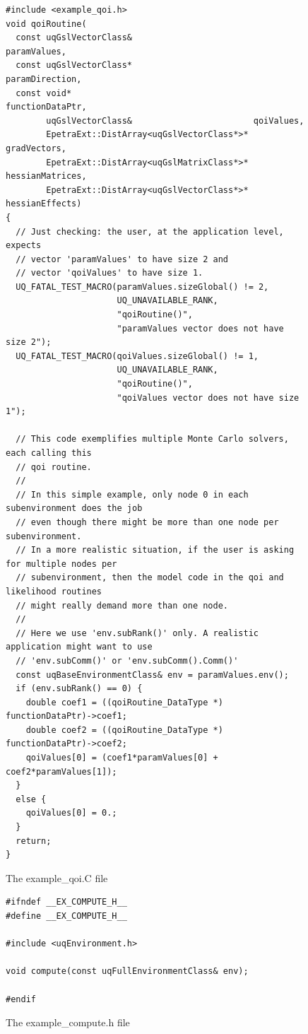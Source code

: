 \begin{figure}[h!]
\begin{center}
\begin{verbatim}
#include <example_qoi.h>
void qoiRoutine(
  const uqGslVectorClass&                        paramValues,
  const uqGslVectorClass*                        paramDirection,
  const void*                                    functionDataPtr,
        uqGslVectorClass&                        qoiValues,
        EpetraExt::DistArray<uqGslVectorClass*>* gradVectors,
        EpetraExt::DistArray<uqGslMatrixClass*>* hessianMatrices,
        EpetraExt::DistArray<uqGslVectorClass*>* hessianEffects)
{
  // Just checking: the user, at the application level, expects
  // vector 'paramValues' to have size 2 and
  // vector 'qoiValues' to have size 1.
  UQ_FATAL_TEST_MACRO(paramValues.sizeGlobal() != 2,
                      UQ_UNAVAILABLE_RANK,
                      "qoiRoutine()",
                      "paramValues vector does not have size 2");
  UQ_FATAL_TEST_MACRO(qoiValues.sizeGlobal() != 1,
                      UQ_UNAVAILABLE_RANK,
                      "qoiRoutine()",
                      "qoiValues vector does not have size 1");

  // This code exemplifies multiple Monte Carlo solvers, each calling this
  // qoi routine.
  //
  // In this simple example, only node 0 in each subenvironment does the job
  // even though there might be more than one node per subenvironment.
  // In a more realistic situation, if the user is asking for multiple nodes per
  // subenvironment, then the model code in the qoi and likelihood routines
  // might really demand more than one node.
  //
  // Here we use 'env.subRank()' only. A realistic application might want to use
  // 'env.subComm()' or 'env.subComm().Comm()'
  const uqBaseEnvironmentClass& env = paramValues.env();
  if (env.subRank() == 0) {
    double coef1 = ((qoiRoutine_DataType *) functionDataPtr)->coef1;
    double coef2 = ((qoiRoutine_DataType *) functionDataPtr)->coef2;
    qoiValues[0] = (coef1*paramValues[0] + coef2*paramValues[1]);
  }
  else {
    qoiValues[0] = 0.;
  }
  return;
}
\end{verbatim}
\end{center}
\caption{
The example\_qoi.C file
}
\label{fig-qoi-c}
\end{figure}

\begin{figure}[h!]
\begin{center}
\begin{verbatim}
#ifndef __EX_COMPUTE_H__
#define __EX_COMPUTE_H__

#include <uqEnvironment.h>

void compute(const uqFullEnvironmentClass& env);

#endif
\end{verbatim}
\end{center}
\caption{
The example\_compute.h file
}
\label{fig-compute-h}
\end{figure}

